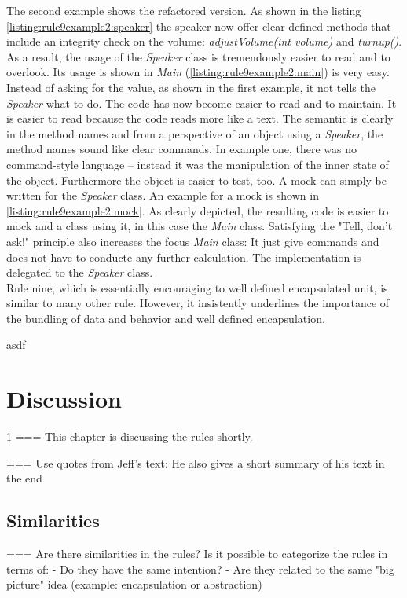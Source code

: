 The second example shows the refactored version. As shown in the listing \ref{listing:rule9example2:speaker} the speaker now offer clear defined methods that include an integrity check on the volume: \textit{adjustVolume(int volume)} and \textit{turnup()}. As a result, the usage of the \textit{Speaker} class is tremendously easier to read and to overlook. Its usage is shown in \textit{Main} (\ref{listing:rule9example2:main}) is very easy. 
\\

Instead of asking for the value, as shown in the first example, it not tells the \textit{Speaker} what to do. The code has now become easier to read and to maintain. It is easier to read because the code reads more like a text. The semantic is clearly in the method names and from a perspective of an object using a \textit{Speaker}, the method names sound like clear commands. In example one, there was no command-style language -- instead it was the manipulation of the inner state of the object. Furthermore the object is easier to test, too. A mock can simply be written for the \textit{Speaker} class. An example for a mock is shown in \ref{listing:rule9example2:mock}. As clearly depicted, the resulting code is easier to mock and a class using it, in this case the \textit{Main} class. Satisfying the "Tell, don't ask!" principle also increases the focus \textit{Main} class: It just give commands and does not have to conducte any further calculation. The implementation is delegated to the \textit{Speaker} class. 
\\

Rule nine, which is essentially encouraging to well defined encapsulated unit, is similar to many other rule. However, it insistently underlines the importance of the bundling of data and behavior and well defined encapsulation. 


asdf
\section{Discussion}
\label{d:discussion}
\ref{d:discussion}
=== This chapter is discussing the rules shortly. 

=== Use quotes from Jeff's text: He also gives a short summary of his text in the end

\subsection*{Similarities}
=== Are there similarities in the rules? Is it possible to categorize the rules in terms of: 
 - Do they have the same intention?
 - Are they related to the same "big picture" idea (example: encapsulation or abstraction) 

